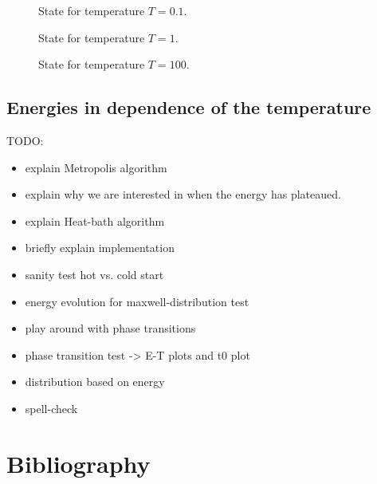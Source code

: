 \begin{figure}
\begin{minipage}{0.25\textwidth}
\centering
\graphicspath{{../../Plots/}}

\caption{State for temperature $T=0.1$.}
\label{fi:High_temp_state}
\end{minipage}
\hfill
\begin{minipage}{0.25\textwidth}
\centering
\graphicspath{{../../Plots/}}

\caption{State for temperature $T=1$.}
\label{fi:Medium_temp_state}
\end{minipage}
\hfill
\begin{minipage}{0.25\textwidth}
\centering
\graphicspath{{../../Plots/}}

\caption{State for temperature $T=100$.}
\label{fi:Low_temp_state}
\end{minipage}
\end{figure}

\subsection*{Energies in dependence of the temperature}

\begin{figure}
\centering
\graphicspath{{../../Plots/}}

\end{figure}

\newpage
TODO:
\begin{itemize}
\item explain Metropolis algorithm
\item explain why we are interested in when the energy has plateaued.
\item explain Heat-bath algorithm
\item briefly explain implementation
\item sanity test hot vs. cold start
\item energy evolution for maxwell-distribution test
\item play around with phase transitions
\item phase transition test -> E-T plots and t0 plot
\item distribution based on energy
\item spell-check
\end{itemize}


\newpage
\section*{Bibliography}
\printbibliography[heading=none, keyword={secondary}]


